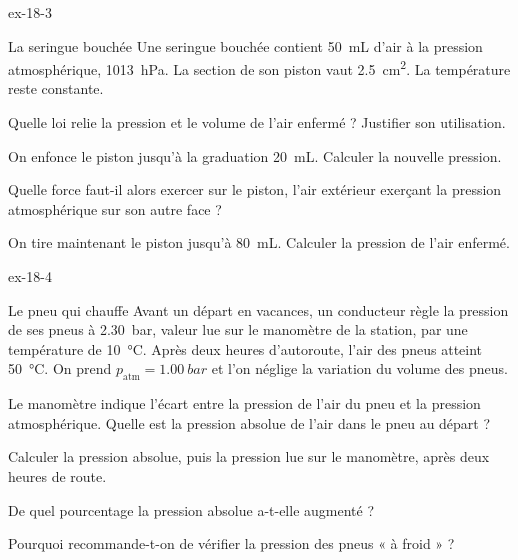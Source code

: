 \begin{blocLivre}{ex-18-3}
\begin{exercice}[1]{La seringue bouchée}
Une seringue bouchée contient \qty{50}{mL} d'air à la pression atmosphérique, \qty{1013}{hPa}. La section de son piston
vaut \qty{2,5}{cm^2}. La température reste constante.
\begin{questions}
\item Quelle loi relie la pression et le volume de l'air enfermé ? Justifier son utilisation.
\item On enfonce le piston jusqu'à la graduation \qty{20}{mL}. Calculer la nouvelle pression.
\item Quelle force faut-il alors exercer sur le piston, l'air extérieur exerçant la pression atmosphérique sur son
autre face ?
\item On tire maintenant le piston jusqu'à \qty{80}{mL}. Calculer la pression de l'air enfermé.
\end{questions}
\end{exercice}
\end{blocLivre}
\begin{blocLivre}{ex-18-4}
\begin{exercice}[1]{Le pneu qui chauffe}
Avant un départ en vacances, un conducteur règle la pression de ses pneus à \qty{2,30}{bar}, valeur lue sur le manomètre
de la station, par une température de \qty{10}{\degreeCelsius}. Après deux heures d'autoroute, l'air des pneus atteint
\qty{50}{\degreeCelsius}. On prend $p_\mathrm{atm}=\qty{1,00}{bar}$ et l'on néglige la variation du volume des pneus.
\begin{questions}
\item Le manomètre indique l'écart entre la pression de l'air du pneu et la pression atmosphérique. Quelle est la
pression absolue de l'air dans le pneu au départ ?
\item Calculer la pression absolue, puis la pression lue sur le manomètre, après deux heures de route.
\item De quel pourcentage la pression absolue a-t-elle augmenté ?
\item Pourquoi recommande-t-on de vérifier la pression des pneus « à froid » ?
\end{questions}
\end{exercice}
\end{blocLivre}

